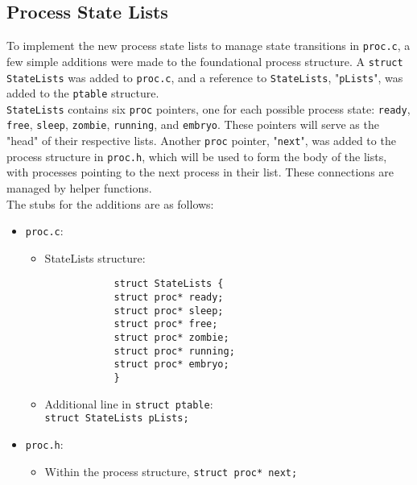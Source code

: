 \documentclass[11pt,letterpaper]{report}
\begin{document}
		\subsection{Process State Lists}
		
		To implement the new process state lists to manage state transitions in {\tt proc.c}, a few simple additions were made to the foundational process structure. A {\tt struct StateLists} was added to {\tt proc.c}, and a reference to {\tt StateLists}, "{\tt pLists}", was added to the {\tt ptable} structure.\\
		{\tt StateLists} contains six {\tt proc} pointers, one for each possible process state: {\tt ready}, {\tt free}, {\tt sleep}, {\tt zombie}, {\tt running}, and {\tt embryo}. These pointers will serve as the "head" of their respective lists. Another {\tt proc} pointer, "{\tt next}", was added to the process structure in {\tt proc.h}, which will be used to form the body of the lists, with processes pointing to the next process in their list. These connections are managed by helper functions.\\
		The stubs for the additions are as follows:
		\begin{itemize}
			\item {\tt proc.c}:
			\begin{itemize}
			\item StateLists structure:
			\begin{verbatim}
			struct StateLists {
			struct proc* ready;
			struct proc* sleep;
			struct proc* free;
			struct proc* zombie;
			struct proc* running;
			struct proc* embryo;
			}
			\end{verbatim}
			\item Additional line in {\tt struct ptable}:\\
			{\tt struct StateLists pLists;}
			\end{itemize}
			
			\item {\tt proc.h}:
			\begin{itemize}
				\item Within the process structure, {\tt struct proc* next;}
			\end{itemize}
			
		\end{itemize}
	
\end{document}
